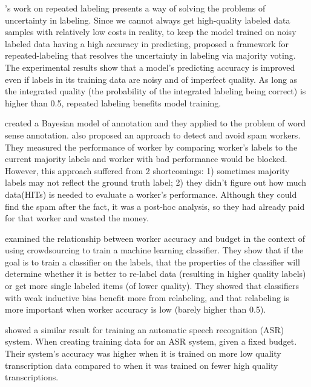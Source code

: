 \documentclass[11pt,letterpaper]{article}
\begin{document}
's work on repeated labeling presents a way of solving the problems of uncertainty in labeling. Since we cannot always get high-quality labeled data samples with relatively low costs in reality, to keep the model trained on noisy labeled data having a high accuracy in predicting,  proposed a framework for repeated-labeling that resolves the uncertainty in labeling via majority voting. The experimental results show that a model's predicting accuracy is improved even if labels in its training data are noisy and of imperfect quality.  As long as the integrated quality (the probability of the integrated labeling being correct) is higher than 0.5, repeated labeling benefits model training. 

 created a Bayesian model of annotation and they applied to the problem of word sense annotation.  also proposed an approach to detect and avoid spam workers. 
They measured the performance of worker by comparing worker's labels to the current majority labels and worker with bad performance would be blocked. However, this approach suffered from 2 shortcomings: 1) sometimes majority labels may not reflect the ground truth label; 2) they didn't figure out  how much data(HITs) is needed to evaluate a worker's performance. Although they could find the spam after the fact, it was a post-hoc analysis, so they had already paid for that worker and wasted the money.

 examined the relationship between worker accuracy and budget in the context of using crowdsourcing to train a machine learning classifier.  They show that if the goal is to train a classifier on the labels, that the properties of the classifier will determine whether it is better to re-label data (resulting in higher quality labels) or get more single labeled items (of lower quality). They showed that classifiers with weak inductive bias  benefit more from relabeling, and that relabeling is more important when worker accuracy is low (barely higher than 0.5). 

 showed a similar result for training an automatic speech recognition (ASR) system.  When creating training data for an ASR system, given a fixed budget. Their system's accuracy was higher when it is trained on more low quality transcription data compared to when it was trained on fewer high quality transcriptions.
\end{document}

